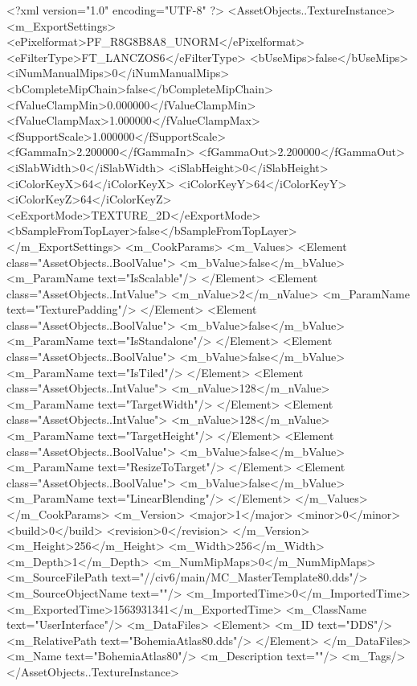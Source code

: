 <?xml version="1.0" encoding="UTF-8" ?>
<AssetObjects..TextureInstance>
	<m_ExportSettings>
		<ePixelformat>PF_R8G8B8A8_UNORM</ePixelformat>
		<eFilterType>FT_LANCZOS6</eFilterType>
		<bUseMips>false</bUseMips>
		<iNumManualMips>0</iNumManualMips>
		<bCompleteMipChain>false</bCompleteMipChain>
		<fValueClampMin>0.000000</fValueClampMin>
		<fValueClampMax>1.000000</fValueClampMax>
		<fSupportScale>1.000000</fSupportScale>
		<fGammaIn>2.200000</fGammaIn>
		<fGammaOut>2.200000</fGammaOut>
		<iSlabWidth>0</iSlabWidth>
		<iSlabHeight>0</iSlabHeight>
		<iColorKeyX>64</iColorKeyX>
		<iColorKeyY>64</iColorKeyY>
		<iColorKeyZ>64</iColorKeyZ>
		<eExportMode>TEXTURE_2D</eExportMode>
		<bSampleFromTopLayer>false</bSampleFromTopLayer>
	</m_ExportSettings>
	<m_CookParams>
		<m_Values>
			<Element class="AssetObjects..BoolValue">
				<m_bValue>false</m_bValue>
				<m_ParamName text="IsScalable"/>
			</Element>
			<Element class="AssetObjects..IntValue">
				<m_nValue>2</m_nValue>
				<m_ParamName text="TexturePadding"/>
			</Element>
			<Element class="AssetObjects..BoolValue">
				<m_bValue>false</m_bValue>
				<m_ParamName text="IsStandalone"/>
			</Element>
			<Element class="AssetObjects..BoolValue">
				<m_bValue>false</m_bValue>
				<m_ParamName text="IsTiled"/>
			</Element>
			<Element class="AssetObjects..IntValue">
				<m_nValue>128</m_nValue>
				<m_ParamName text="TargetWidth"/>
			</Element>
			<Element class="AssetObjects..IntValue">
				<m_nValue>128</m_nValue>
				<m_ParamName text="TargetHeight"/>
			</Element>
			<Element class="AssetObjects..BoolValue">
				<m_bValue>false</m_bValue>
				<m_ParamName text="ResizeToTarget"/>
			</Element>
			<Element class="AssetObjects..BoolValue">
				<m_bValue>false</m_bValue>
				<m_ParamName text="LinearBlending"/>
			</Element>
		</m_Values>
	</m_CookParams>
	<m_Version>
		<major>1</major>
		<minor>0</minor>
		<build>0</build>
		<revision>0</revision>
	</m_Version>
	<m_Height>256</m_Height>
	<m_Width>256</m_Width>
	<m_Depth>1</m_Depth>
	<m_NumMipMaps>0</m_NumMipMaps>
	<m_SourceFilePath text="//civ6/main/MC_MasterTemplate\Textures\BohemiaAtlas80.dds"/>
	<m_SourceObjectName text=""/>
	<m_ImportedTime>0</m_ImportedTime>
	<m_ExportedTime>1563931341</m_ExportedTime>
	<m_ClassName text="UserInterface"/>
	<m_DataFiles>
		<Element>
			<m_ID text="DDS"/>
			<m_RelativePath text="BohemiaAtlas80.dds"/>
		</Element>
	</m_DataFiles>
	<m_Name text="BohemiaAtlas80"/>
	<m_Description text=""/>
	<m_Tags/>
</AssetObjects..TextureInstance>


